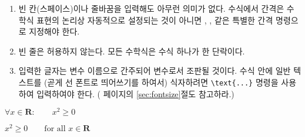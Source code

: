 \begin{enumerate}

\item {} 빈 칸(스페이스)이나 줄바꿈을 입력해도 아무런 의미가 없다.
수식에서 간격은 수학식 표현의 논리상 자동적으로 설정되는 것이 아니면 \ci{,}, ,  같은 
특별한 간격 명령으로 지정해야 한다.

\item 빈 줄은 허용하지 않는다. 모든 수학식은 수식 하나가 한 단락이다.

\item 입력한 글자는 변수 이름으로 간주되어 변수로서 조판될 것이다. 수식 안에 일반 텍스트를 
(곧게 선 폰트로 띄어쓰기를 하여서) 식자하려면 \verb|\text{...}| 명령을 사용하여 입력하여야 한다. (\pageref{sec:fontsize} 페이지의 
\ref{sec:fontsize}절도 참고하라.)

\end{enumerate}
\begin{example}
$\forall x \in \mathbf{R}:
 \qquad x^{2} \geq 0$
\end{example}
\vspace{-.5\onelineskip}
\begin{example}
$x^{2} \geq 0\qquad
 \text{for all }x\in\mathbf{R}$
\end{example}


